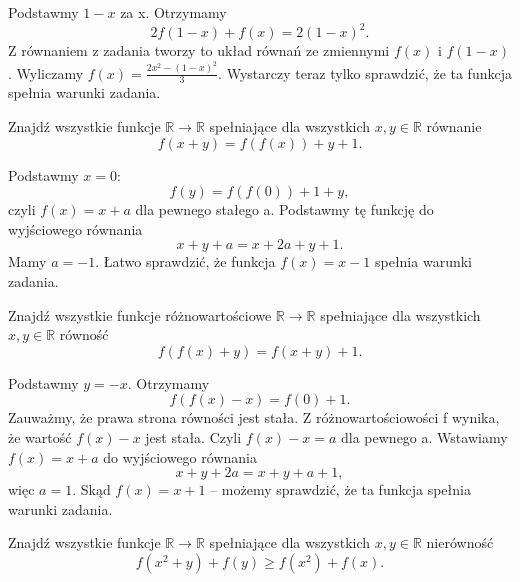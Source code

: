 
\noindent
Podstawmy $1-x$ za x. Otrzymamy 
\[ 
	2f(1 - x) + f(x) = 2(1 - x)^{2}.
\] 
Z równaniem z zadania tworzy to układ równań ze zmiennymi $f(x)$ i $f(1 - x)$. Wyliczamy $f(x) = \frac{2x^{2}-(1-x)^{2}} {3} $. Wystarczy teraz tylko sprawdzić, że ta funkcja spełnia warunki zadania. 

\vspace{5px}

\begin{problem}{5}
	Znajdź wszystkie funkcje $\mathbb{R} \rightarrow \mathbb{R} $ spełniające dla wszystkich $x, y \in \mathbb{R} $ równanie 
	\[
		f(x+y) = f(f(x)) + y + 1.
	\] 
\end{problem}


\noindent
Podstawmy $x = 0$: 
\[
 f(y) = f(f(0)) + 1 + y, 
\] 
czyli $f(x) = x + a$ dla pewnego stałego a. Podstawmy tę funkcję do wyjściowego równania
\[
	x+y+a=x+2a+y+1.
\] 
Mamy $a = -1$. Łatwo sprawdzić, że funkcja $f(x) = x - 1$ spełnia warunki zadania. 

\vspace{5px}

\begin{problem}{6}
	Znajdź wszystkie funkcje różnowartościowe
	$\mathbb{R} \rightarrow \mathbb{R} $ spełniające dla wszystkich $x, y \in \mathbb{R} $ równość 
	\[
		f(f(x) + y) = f(x+y) + 1.
	\]
\end{problem}


\noindent
Podstawmy $y = -x$. Otrzymamy 
\[ 
	f(f(x) - x) = f(0) + 1.
\] 
Zauważmy, że prawa strona równości jest stała. Z różnowartościowości f wynika, że wartość $f(x) - x$ jest stała. Czyli $f(x) - x = a$ dla pewnego a. Wstawiamy $f(x) = x + a$ do wyjściowego równania 
\[
	x + y + 2a = x + y + a + 1,
\]
więc $a = 1$. Skąd $f(x) = x + 1 $ -- możemy sprawdzić, że ta funkcja spełnia warunki zadania.

\newpage

\begin{problem}{7}
	Znajdź wszystkie funkcje 
	$\mathbb{R} \rightarrow \mathbb{R} $ spełniające dla wszystkich $x, y \in \mathbb{R} $ nierówność 
	\[
		f(x^2+y) + f(y) \geqslant f(x^2) + f(x).
	\] 
\end{problem}

